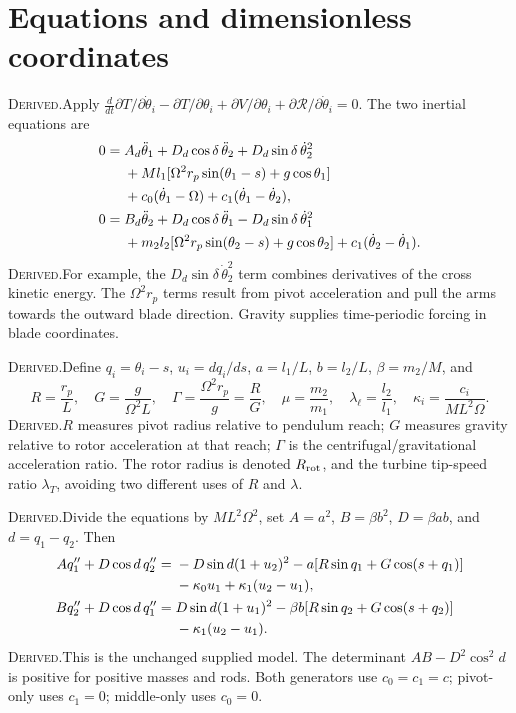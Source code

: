 \documentclass[10pt,a4paper]{article}
\newcommand{\D}{\textcolor{accent}{\textsc{Derived.}}\enspace}
\newcommand{\page}[1]{\clearpage\section{#1}}
\begin{document}
\page{Equations and dimensionless coordinates}
\D Apply $\frac{d}{dt}\partial T/\partial\dot\theta_i-\partial T/\partial\theta_i+\partial V/\partial\theta_i+\partial\mathcal R/\partial\dot\theta_i=0$. The two inertial equations are
\begin{align}
0={}&A_d\ddot\theta_1+D_d\cos\delta\,\ddot\theta_2+D_d\sin\delta\,\dot\theta_2^2\notag\\
&+Ml_1[\Omega^2r_p\sin(\theta_1-s)+g\cos\theta_1]\notag\\
&+c_0(\dot\theta_1-\Omega)+c_1(\dot\theta_1-\dot\theta_2),\\
0={}&B_d\ddot\theta_2+D_d\cos\delta\,\ddot\theta_1-D_d\sin\delta\,\dot\theta_1^2\notag\\
&+m_2l_2[\Omega^2r_p\sin(\theta_2-s)+g\cos\theta_2]+c_1(\dot\theta_2-\dot\theta_1).
\end{align}
\D For example, the $D_d\sin\delta\,\dot\theta_2^2$ term combines derivatives of the cross kinetic energy. The $\Omega^2r_p$ terms result from pivot acceleration and pull the arms towards the outward blade direction. Gravity supplies time-periodic forcing in blade coordinates.

\D Define $q_i=\theta_i-s$, $u_i=dq_i/ds$, $a=l_1/L$, $b=l_2/L$, $\beta=m_2/M$, and
\begin{equation}
R=\frac{r_p}{L},\quad G=\frac{g}{\Omega^2L},\quad\Gamma=\frac{\Omega^2r_p}{g}=\frac RG,\quad
\mu=\frac{m_2}{m_1},\quad\lambda_\ell=\frac{l_2}{l_1},\quad\kappa_i=\frac{c_i}{ML^2\Omega}.
\end{equation}
\D $R$ measures pivot radius relative to pendulum reach; $G$ measures gravity relative to rotor acceleration at that reach; $\Gamma$ is the centrifugal/gravitational acceleration ratio. The rotor radius is denoted $R_{\rm rot}$, and the turbine tip-speed ratio $\lambda_T$, avoiding two different uses of $R$ and $\lambda$.

\D Divide the equations by $ML^2\Omega^2$, set $A=a^2$, $B=\beta b^2$, $D=\beta ab$, and $d=q_1-q_2$. Then
\begin{align}
Aq_1''+D\cos d\,q_2''={}&-D\sin d(1+u_2)^2-a[R\sin q_1+G\cos(s+q_1)]\notag\\
&-\kappa_0u_1+\kappa_1(u_2-u_1),\\
Bq_2''+D\cos d\,q_1''={}&D\sin d(1+u_1)^2-\beta b[R\sin q_2+G\cos(s+q_2)]\notag\\
&-\kappa_1(u_2-u_1).
\end{align}
\D This is the unchanged supplied model. The determinant $AB-D^2\cos^2d$ is positive for positive masses and rods. Both generators use $c_0=c_1=c$; pivot-only uses $c_1=0$; middle-only uses $c_0=0$.
\end{document}
